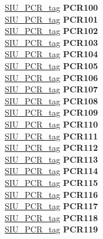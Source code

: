 \begin{DoxyCompactItemize}
\begin{tabbing}
\>\>\mbox{\hyperlink{unionSIU__tag_1_1SIU__PCR__tag}{SIU\_PCR\_tag}} {\bfseries PCR100}\\
\>\>\mbox{\hyperlink{unionSIU__tag_1_1SIU__PCR__tag}{SIU\_PCR\_tag}} {\bfseries PCR101}\\
\>\>\mbox{\hyperlink{unionSIU__tag_1_1SIU__PCR__tag}{SIU\_PCR\_tag}} {\bfseries PCR102}\\
\>\>\mbox{\hyperlink{unionSIU__tag_1_1SIU__PCR__tag}{SIU\_PCR\_tag}} {\bfseries PCR103}\\
\>\>\mbox{\hyperlink{unionSIU__tag_1_1SIU__PCR__tag}{SIU\_PCR\_tag}} {\bfseries PCR104}\\
\>\>\mbox{\hyperlink{unionSIU__tag_1_1SIU__PCR__tag}{SIU\_PCR\_tag}} {\bfseries PCR105}\\
\>\>\mbox{\hyperlink{unionSIU__tag_1_1SIU__PCR__tag}{SIU\_PCR\_tag}} {\bfseries PCR106}\\
\>\>\mbox{\hyperlink{unionSIU__tag_1_1SIU__PCR__tag}{SIU\_PCR\_tag}} {\bfseries PCR107}\\
\>\>\mbox{\hyperlink{unionSIU__tag_1_1SIU__PCR__tag}{SIU\_PCR\_tag}} {\bfseries PCR108}\\
\>\>\mbox{\hyperlink{unionSIU__tag_1_1SIU__PCR__tag}{SIU\_PCR\_tag}} {\bfseries PCR109}\\
\>\>\mbox{\hyperlink{unionSIU__tag_1_1SIU__PCR__tag}{SIU\_PCR\_tag}} {\bfseries PCR110}\\
\>\>\mbox{\hyperlink{unionSIU__tag_1_1SIU__PCR__tag}{SIU\_PCR\_tag}} {\bfseries PCR111}\\
\>\>\mbox{\hyperlink{unionSIU__tag_1_1SIU__PCR__tag}{SIU\_PCR\_tag}} {\bfseries PCR112}\\
\>\>\mbox{\hyperlink{unionSIU__tag_1_1SIU__PCR__tag}{SIU\_PCR\_tag}} {\bfseries PCR113}\\
\>\>\mbox{\hyperlink{unionSIU__tag_1_1SIU__PCR__tag}{SIU\_PCR\_tag}} {\bfseries PCR114}\\
\>\>\mbox{\hyperlink{unionSIU__tag_1_1SIU__PCR__tag}{SIU\_PCR\_tag}} {\bfseries PCR115}\\
\>\>\mbox{\hyperlink{unionSIU__tag_1_1SIU__PCR__tag}{SIU\_PCR\_tag}} {\bfseries PCR116}\\
\>\>\mbox{\hyperlink{unionSIU__tag_1_1SIU__PCR__tag}{SIU\_PCR\_tag}} {\bfseries PCR117}\\
\>\>\mbox{\hyperlink{unionSIU__tag_1_1SIU__PCR__tag}{SIU\_PCR\_tag}} {\bfseries PCR118}\\
\>\>\mbox{\hyperlink{unionSIU__tag_1_1SIU__PCR__tag}{SIU\_PCR\_tag}} {\bfseries PCR119}\\

\end{tabbing}
\end{DoxyCompactItemize}
